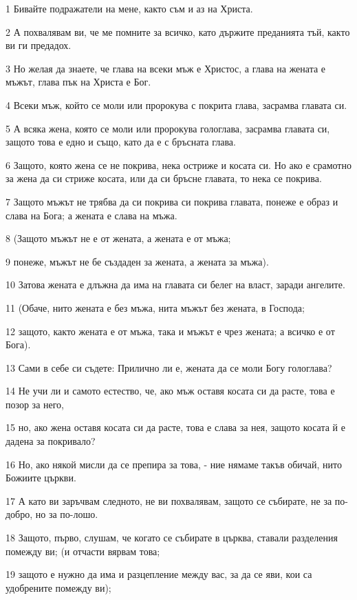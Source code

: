 \par 1 Бивайте подражатели на мене, както съм и аз на Христа.
\par 2 А похвалявам ви, че ме помните за всичко, като държите преданията тъй, както ви ги предадох.
\par 3 Но желая да знаете, че глава на всеки мъж е Христос, а глава на жената е мъжът, глава пък на Христа е Бог.
\par 4 Всеки мъж, който се моли или пророкува с покрита глава, засрамва главата си.
\par 5 А всяка жена, която се моли или пророкува гологлава, засрамва главата си, защото това е едно и също, като да е с бръсната глава.
\par 6 Защото, която жена се не покрива, нека остриже и косата си. Но ако е срамотно за жена да си стриже косата, или да си бръсне главата, то нека се покрива.
\par 7 Защото мъжът не трябва да си покрива си покрива главата, понеже е образ и слава на Бога; а жената е слава на мъжа.
\par 8 (Защото мъжът не е от жената, а жената е от мъжа;
\par 9 понеже, мъжът не бе създаден за жената, а жената за мъжа).
\par 10 Затова жената е длъжна да има на главата си белег на власт, заради ангелите.
\par 11 (Обаче, нито жената е без мъжа, нита мъжът без жената, в Господа;
\par 12 защото, както жената е от мъжа, така и мъжът е чрез жената; а всичко е от Бога).
\par 13 Сами в себе си съдете: Прилично ли е, жената да се моли Богу гологлава?
\par 14 Не учи ли и самото естество, че, ако мъж оставя косата си да расте, това е позор за него,
\par 15 но, ако жена оставя косата си да расте, това е слава за нея, защото косата й е дадена за покривало?
\par 16 Но, ако някой мисли да се препира за това, - ние нямаме такъв обичай, нито Божиите църкви.
\par 17 А като ви заръчвам следното, не ви похвалявам, защото се събирате, не за по-добро, но за по-лошо.
\par 18 Защото, първо, слушам, че когато се събирате в църква, ставали разделения помежду ви; (и отчасти вярвам това;
\par 19 защото е нужно да има и разцепление между вас, за да се яви, кои са удобрените помежду ви);
